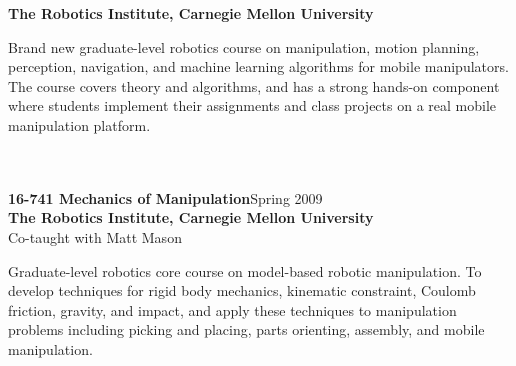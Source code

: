 \textbf{The Robotics Institute, Carnegie Mellon University}\\
\parbox[t]{0.75\textwidth}{
Brand new graduate-level robotics course on manipulation, motion planning, perception, navigation,
and machine learning algorithms for mobile manipulators. The course covers theory and algorithms,
and has a strong hands-on component where students implement their assignments and class projects on a real mobile manipulation platform.
}\\
\\
\textbf{16-741 Mechanics of Manipulation}\hfill Spring 2009\\
\textbf{The Robotics Institute, Carnegie Mellon University}\\
Co-taught with Matt Mason\\
\parbox[t]{0.75\textwidth}{
Graduate-level robotics core course on model-based robotic manipulation.
To develop techniques for rigid body mechanics, kinematic constraint, Coulomb
friction, gravity, and impact, and apply these techniques to manipulation
problems including picking and placing, parts orienting, assembly, and mobile
manipulation. 
}\\
